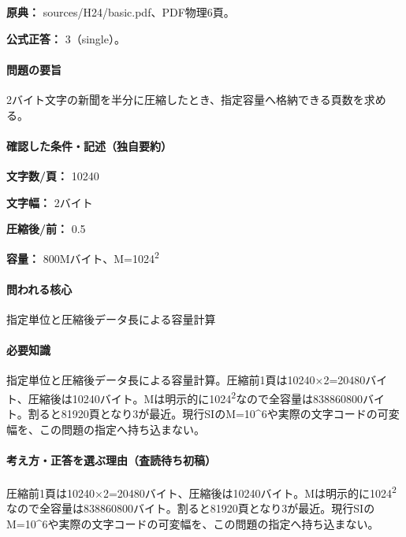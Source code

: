 \noindent\textbf{原典：} sources/H24/basic.pdf、PDF物理6頁。

\textbf{公式正答：} 3（single）。

\paragraph{問題の要旨} 2バイト文字の新聞を半分に圧縮したとき、指定容量へ格納できる頁数を求める。

\paragraph{確認した条件・記述（独自要約）}\mbox{}\par

\noindent\textbf{文字数/頁：} 10240\par

\noindent\textbf{文字幅：} 2バイト\par

\noindent\textbf{圧縮後/前：} 0.5\par

\noindent\textbf{容量：} 800Mバイト、M=\allowbreak{}1024\textsuperscript{2}\par

\paragraph{問われる核心} 指定単位と圧縮後データ長による容量計算

\paragraph{必要知識} 指定単位と圧縮後データ長による容量計算。圧縮前1頁は10240×2=\allowbreak{}20480バイト、圧縮後は10240バイト。Mは明示的に1024\textsuperscript{2}なので全容量は838860800バイト。割ると81920頁となり3が最近。現行SIのM=\allowbreak{}10\textasciicircum{}6や実際の文字コードの可変幅を、この問題の指定へ持ち込まない。

\paragraph{考え方・正答を選ぶ理由（査読待ち初稿）} 圧縮前1頁は10240×2=\allowbreak{}20480バイト、圧縮後は10240バイト。Mは明示的に1024\textsuperscript{2}なので全容量は838860800バイト。割ると81920頁となり3が最近。現行SIのM=\allowbreak{}10\textasciicircum{}6や実際の文字コードの可変幅を、この問題の指定へ持ち込まない。

